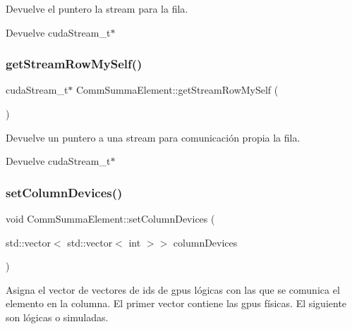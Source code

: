 Devuelve el puntero la stream para la fila. 

\begin{DoxyReturn}{Devuelve}
cuda\+Stream\+\_\+t$\ast$ 
\end{DoxyReturn}
\mbox{\label{classCommSummaElement_ae777b3cbe1840c0cf82bb082240617d1}} 
\subsubsection{\texorpdfstring{get\+Stream\+Row\+My\+Self()}{getStreamRowMySelf()}}
{\footnotesize\ttfamily cuda\+Stream\+\_\+t$\ast$ Comm\+Summa\+Element\+::get\+Stream\+Row\+My\+Self (\begin{DoxyParamCaption}{ }\end{DoxyParamCaption})}



Devuelve un puntero a una stream para comunicación propia la fila. 

\begin{DoxyReturn}{Devuelve}
cuda\+Stream\+\_\+t$\ast$ 
\end{DoxyReturn}
\mbox{\label{classCommSummaElement_a0cf00376959a9d9af936eb43324b6b93}} 
\subsubsection{\texorpdfstring{set\+Column\+Devices()}{setColumnDevices()}}
{\footnotesize\ttfamily void Comm\+Summa\+Element\+::set\+Column\+Devices (\begin{DoxyParamCaption}\item[{std\+::vector$<$ std\+::vector$<$ int $>$$>$}]{column\+Devices }\end{DoxyParamCaption})}



Asigna el vector de vectores de ids de gpus lógicas con las que se comunica el elemento en la columna. El primer vector contiene las gpus físicas. El siguiente son lógicas o simuladas. 


